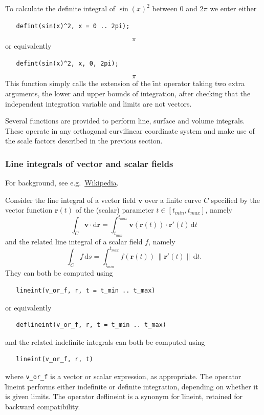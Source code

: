 \example{}

 
\hypertarget{operator:DEFINT}{}
To calculate the definite integral of $\sin(x)^2$ between $0$ and
$2\pi$ we enter either
\begin{verbatim}
   defint(sin(x)^2, x = 0 .. 2pi);
\end{verbatim}
\[ \pi \]
or equivalently
\begin{verbatim}
   defint(sin(x)^2, x, 0, 2pi);
\end{verbatim}
\[ \pi \]
This function simply calls the extension of the \f{int} operator
taking two extra arguments, the lower and upper bounds of integration,
after checking that the independent integration variable and limits
are not vectors.

Several functions are provided to perform line, surface and volume
integrals.  These operate in any orthogonal curvilinear coordinate
system and make use of the scale factors described in the previous
section.

\subsubsection{Line integrals of vector and scalar fields}

 
\hypertarget{operator:LINEINT}{}\hypertarget{operator:DEFLINEINT}{}
 
For background, see e.g.\
\href{https://en.wikipedia.org/wiki/Line_integral}{Wikipedia}.

Consider the line integral of a vector field $\mathbf{v}$ over a
finite curve $C$ specified by the vector function $\mathbf{r}(t)$
of the (scalar) parameter $t \in [t_\mathit{min},t_\mathit{max}]$, namely
\[
\int_C \mathbf{v} \cdot \mathrm{d}\mathbf{r} =
\int_{t_\mathit{min}}^{t_\mathit{max}}
\mathbf{v}(\mathbf{r}(t)) \cdot \mathbf{r}'(t) \, \mathrm{d}t
\]
and the related line integral of a scalar field $f$, namely
\[
\int_C f \,\mathrm{d}s =
\int_{t_\mathit{min}}^{t_\mathit{max}}
f(\mathbf{r}(t)) \, \|\mathbf{r}'(t)\| \, \mathrm{d}t.
\]
They can both be computed using
\begin{verbatim}
   lineint(v_or_f, r, t = t_min .. t_max)
\end{verbatim}
or equivalently
\begin{verbatim}
   deflineint(v_or_f, r, t = t_min .. t_max)
\end{verbatim}
and the related indefinite integrals can both be computed using
\begin{verbatim}
   lineint(v_or_f, r, t)
\end{verbatim}
where \texttt{v\_or\_f} is a vector or scalar expression, as
appropriate.  The operator \f{lineint} performs either indefinite or
definite integration, depending on whether it is given limits.  The
operator \f{deflineint} is a synonym for \f{lineint}, retained for
backward compatibility.

